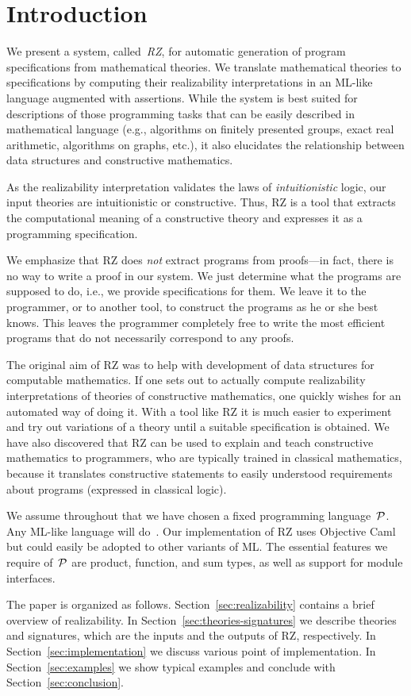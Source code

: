 \section{Introduction}
\label{sec:introduction}

We present a system, called~\emph{RZ}, for automatic generation of
program specifications from mathematical theories. We translate
mathematical theories to specifications by computing their
realizability interpretations in an ML-like language augmented with
assertions. While the system is best suited for descriptions of those
programming tasks that can be easily described in mathematical
language (e.g., algorithms on finitely presented groups, exact real
arithmetic, algorithms on graphs, etc.), it also elucidates the
relationship between data structures and constructive mathematics.

As the realizability interpretation validates the laws of
\emph{intuitionistic} logic, our input theories are intuitionistic or
constructive. Thus, RZ is a tool that extracts the computational
meaning of a constructive theory and expresses it as a programming
specification.

We emphasize that RZ does \emph{not} extract programs from proofs---in
fact, there is no way to write a proof in our system. We just
determine what the programs are supposed to do, i.e., we provide
specifications for them. We leave it to the programmer, or to another
tool, to construct the programs as he or she best knows. This leaves
the programmer completely free to write the most efficient programs
that do not necessarily correspond to any proofs.

The original aim of RZ was to help with development of data structures
for computable mathematics. If one sets out to actually compute
realizability interpretations of theories of constructive mathematics,
one quickly wishes for an automated way of doing it. With a tool like
RZ it is much easier to experiment and try out variations of a theory
until a suitable specification is obtained. We have also discovered
that RZ can be used to explain and teach constructive mathematics to
programmers, who are typically trained in classical mathematics,
because it translates constructive statements to easily understood
requirements about programs (expressed in classical logic).

We assume throughout that we have chosen a fixed programming
language~$\mathcal{P}$. Any ML-like language will
do~\cite{milner+:definition}. Our implementation of RZ uses Objective
Caml~\cite{ocaml} but could easily be adopted to other variants of ML.
The essential features we require of~$\mathcal{P}$ are product, function, and
sum types, as well as support for module interfaces.

The paper is organized as follows. Section~\ref{sec:realizability}
contains a brief overview of realizability. In
Section~\ref{sec:theories-signatures} we describe theories and
signatures, which are the inputs and the outputs of RZ, respectively. In
Section~\ref{sec:implementation} we discuss various point of
implementation. In Section~\ref{sec:examples} we show typical examples
and conclude with Section~\ref{sec:conclusion}.


